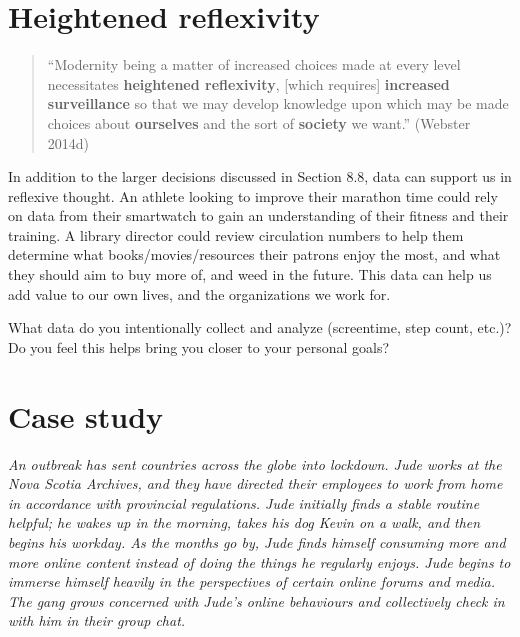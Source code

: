 \documentclass[
  letterpaper,
  DIV=11,
  numbers=noendperiod]{scrreprt}
\begin{document}
\section{Heightened reflexivity}\label{heightened-reflexivity}

\begin{quote}
``Modernity being a matter of increased choices made at every level
necessitates \textbf{heightened reflexivity}, {[}which requires{]}
\textbf{increased surveillance} so that we may develop knowledge upon
which may be made choices about \textbf{ourselves} and the sort of
\textbf{society} we want.'' (Webster 2014d)
\end{quote}

In addition to the larger decisions discussed in Section 8.8, data can
support us in reflexive thought. An athlete looking to improve their
marathon time could rely on data from their smartwatch to gain an
understanding of their fitness and their training. A library director
could review circulation numbers to help them determine what
books/movies/resources their patrons enjoy the most, and what they
should aim to buy more of, and weed in the future. This data can help us
add value to our own lives, and the organizations we work for.~~

\begin{tcolorbox}[enhanced jigsaw, arc=.35mm, bottomrule=.15mm, bottomtitle=1mm, breakable, colback=white, colbacktitle=quarto-callout-tip-color!10!white, colframe=quarto-callout-tip-color-frame, coltitle=black, left=2mm, leftrule=.75mm, opacityback=0, opacitybacktitle=0.6, rightrule=.15mm, title=\textcolor{quarto-callout-tip-color}{\faLightbulb}\hspace{0.5em}{Pause and reflect}, titlerule=0mm, toprule=.15mm, toptitle=1mm]

What data do you intentionally collect and analyze (screentime, step
count, etc.)? Do you feel this helps bring you closer to your personal
goals?~

\end{tcolorbox}

\section{Case study}\label{case-study-5}

\emph{An outbreak has sent countries across the globe into lockdown.
Jude works at the Nova Scotia Archives, and they have directed their
employees to work from home in accordance with provincial regulations.
Jude initially finds a stable routine helpful; he wakes up in the
morning, takes his dog Kevin on a walk, and then begins his workday. As
the months go by, Jude finds himself consuming more and more online
content instead of doing the things he regularly enjoys. Jude begins to
immerse himself heavily in the perspectives of certain online forums and
media. The gang grows concerned with Jude's online behaviours and
collectively check in with him in their group chat.}
\end{document}
